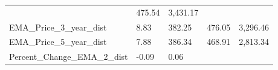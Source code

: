 \documentclass[]{article}
\begin{document}
\begin{longtable}[]{@{}lllll@{}}
\begin{minipage}[t]{0.09\columnwidth}
\end{minipage} & \begin{minipage}[t]{0.09\columnwidth}\raggedright\strut
475.54\strut
\end{minipage} & \begin{minipage}[t]{0.11\columnwidth}\raggedright\strut
3,431.17\strut
\end{minipage}\tabularnewline
\begin{minipage}[t]{0.49\columnwidth}\raggedright\strut
EMA\_Price\_3\_year\_dist\strut
\end{minipage} & \begin{minipage}[t]{0.08\columnwidth}\raggedright\strut
8.83\strut
\end{minipage} & \begin{minipage}[t]{0.09\columnwidth}\raggedright\strut
382.25\strut
\end{minipage} & \begin{minipage}[t]{0.09\columnwidth}\raggedright\strut
476.05\strut
\end{minipage} & \begin{minipage}[t]{0.11\columnwidth}\raggedright\strut
3,296.46\strut
\end{minipage}\tabularnewline
\begin{minipage}[t]{0.49\columnwidth}\raggedright\strut
EMA\_Price\_5\_year\_dist\strut
\end{minipage} & \begin{minipage}[t]{0.08\columnwidth}\raggedright\strut
7.88\strut
\end{minipage} & \begin{minipage}[t]{0.09\columnwidth}\raggedright\strut
386.34\strut
\end{minipage} & \begin{minipage}[t]{0.09\columnwidth}\raggedright\strut
468.91\strut
\end{minipage} & \begin{minipage}[t]{0.11\columnwidth}\raggedright\strut
2,813.34\strut
\end{minipage}\tabularnewline
\begin{minipage}[t]{0.49\columnwidth}\raggedright\strut
Percent\_Change\_EMA\_2\_dist\strut
\end{minipage} & \begin{minipage}[t]{0.08\columnwidth}\raggedright\strut
-0.09\strut
\end{minipage} & \begin{minipage}[t]{0.09\columnwidth}\raggedright\strut
0.06\strut
\end{minipage} & \begin{minipage}[t]{0.09\columnwidth}\raggedright\strut

\end{minipage}
\end{longtable}
\end{document}
